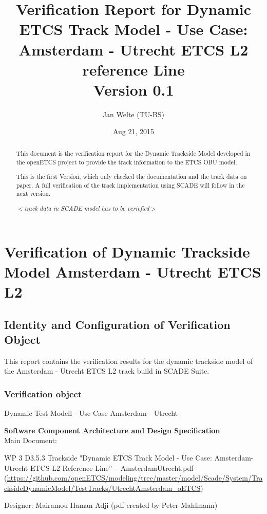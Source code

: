 \documentclass{article}
\title{Verification Report for Dynamic ETCS Track Model - Use Case: Amsterdam - Utrecht ETCS L2 reference Line\\Version 0.1}
\author{Jan Welte (TU-BS)}
\date{Aug 21, 2015}
\newcommand{\tbi}[1]{$<$\textit{#1}$>$}
\begin{document}
\maketitle

\begin{abstract}

This document is the verification report for the Dynamic Trackside Model developed in the openETCS project to provide the track information to the ETCS OBU model. 

This is the first Version, which only checked the documentation and the track data on paper. A full verification of the track implementation using SCADE will follow in the next version.

\tbi{track data in SCADE model has to be veriefied}

\end{abstract}

\section{Verification of Dynamic Trackside Model Amsterdam - Utrecht ETCS L2}

\subsection{Identity and Configuration of Verification Object}

This report contains the verification results for the dynamic trackside model of the Amsterdam - Utrecht ETCS L2 track build in SCADE Suite.

\subsubsection*{Verification object}

Dynamic Test Modell - Use Case Amsterdam - Utrecht 
 
\textbf{Software Component Architecture and Design Specification}
\\
Main Document:

WP 3 D3.5.3 Trackside "Dynamic ETCS Track Model - Use Case: Amsterdam- Utrecht ETCS L2 Reference Line'' -- AmsterdamUtrecht.pdf\\ (\url{https://github.com/openETCS/modeling/tree/master/model/Scade/System/TracksideDynamicModel/TestTracks/UtrechtAmsterdam_oETCS})

Designer: 
Mairamou Haman Adji 
(pdf created by Peter Mahlmann)
\end{document}
